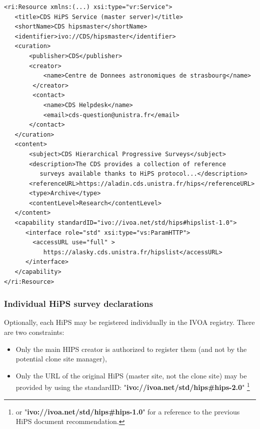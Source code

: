 \documentclass[11pt,a4paper]{ivoa}
\begin{document}
{\footnotesize
\begin{verbatim}
<ri:Resource xmlns:(...) xsi:type="vr:Service">
   <title>CDS HiPS Service (master server)</title>
   <shortName>CDS hipsmaster</shortName>
   <identifier>ivo://CDS/hipsmaster</identifier>
   <curation>
       <publisher>CDS</publisher>
       <creator>
           <name>Centre de Donnees astronomiques de strasbourg</name>
        </creator>
        <contact>
           <name>CDS Helpdesk</name>
           <email>cds-question@unistra.fr</email>
       </contact>
   </curation>
   <content>
       <subject>CDS Hierarchical Progressive Surveys</subject>
       <description>The CDS provides a collection of reference
          surveys available thanks to HiPS protocol...</description>
       <referenceURL>https://aladin.cds.unistra.fr/hips</referenceURL>
       <type>Archive</type>
       <contentLevel>Research</contentLevel>
   </content>
   <capability standardID="ivo://ivoa.net/std/hips#hipslist-1.0">
      <interface role="std" xsi:type="vs:ParamHTTP">
        <accessURL use="full" >
           https://alasky.cds.unistra.fr/hipslist</accessURL>
      </interface>
   </capability>
</ri:Resource>
\end{verbatim}
}

\subsubsection{Individual HiPS survey declarations}
Optionally, each HiPS may be registered individually in the IVOA registry. There are two constraints:
\begin{itemize}[noitemsep,topsep=0pt,parsep=0pt,partopsep=0pt]
\item Only the main HIPS creator is authorized to register them (and not by the potential clone site manager),
\item Only the URL of the original HiPS (master site, not the clone site) may be provided by using the standardID: "{\bf ivo://ivoa.net/std/hips\#hips-2.0}" \footnote{or "{\bf ivo://ivoa.net/std/hips\#hips-1.0}" for a reference to the previous HiPS document recommendation.}
\end{itemize}
\end{document}
